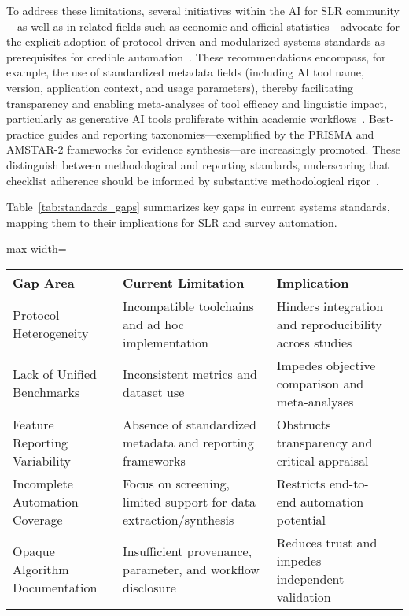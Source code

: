 To address these limitations, several initiatives within the AI for SLR community—as well as in related fields such as economic and official statistics—advocate for the explicit adoption of protocol-driven and modularized systems standards as prerequisites for credible automation~\cite{ref30,ref37,ref43,ref51,ref61,ref89}. These recommendations encompass, for example, the use of standardized metadata fields (including AI tool name, version, application context, and usage parameters), thereby facilitating transparency and enabling meta-analyses of tool efficacy and linguistic impact, particularly as generative AI tools proliferate within academic workflows~\cite{ref98}. Best-practice guides and reporting taxonomies—exemplified by the PRISMA and AMSTAR-2 frameworks for evidence synthesis—are increasingly promoted. These distinguish between methodological and reporting standards, underscoring that checklist adherence should be informed by substantive methodological rigor~\cite{ref43,ref63,ref86,ref106}.

Table~\ref{tab:standards_gaps} summarizes key gaps in current systems standards, mapping them to their implications for SLR and survey automation.

\begin{table*}[htbp]
\centering
\caption{Key Gaps in System Standards and Their Implications for SLR Automation}
\label{tab:standards_gaps}
\begin{adjustbox}{max width=\textwidth}
\begin{tabular}{@{}llll@{}}
\toprule
Gap Area & Current Limitation & Implication &  \\
\midrule
Protocol Heterogeneity & Incompatible toolchains and ad hoc implementation & Hinders integration and reproducibility across studies &  \\
Lack of Unified Benchmarks & Inconsistent metrics and dataset use & Impedes objective comparison and meta-analyses &  \\
Feature Reporting Variability & Absence of standardized metadata and reporting frameworks & Obstructs transparency and critical appraisal &  \\
Incomplete Automation Coverage & Focus on screening, limited support for data extraction/synthesis & Restricts end-to-end automation potential &  \\
Opaque Algorithm Documentation & Insufficient provenance, parameter, and workflow disclosure & Reduces trust and impedes independent validation &  \\
\bottomrule
\end{tabular}
\end{adjustbox}
\end{table*}

